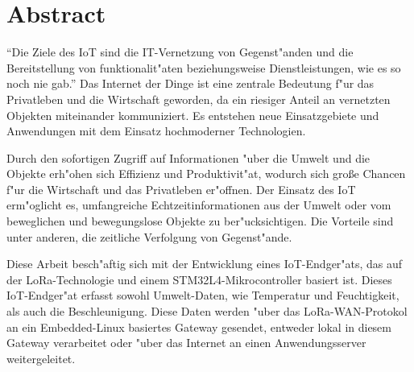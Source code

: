 
\chapter{ Abstract} \label{Abstract}	
\enquote{Die Ziele des IoT sind die IT-Vernetzung von Gegenst"anden und 
die Bereitstellung von funktionalit"aten beziehungsweise 
Dienstleistungen, wie es so noch nie gab.} Das Internet der Dinge ist 
eine zentrale Bedeutung f"ur das Privatleben und die Wirtschaft geworden, 
da ein riesiger Anteil an vernetzten Objekten miteinander kommuniziert. 
Es entstehen neue Einsatzgebiete und Anwendungen mit dem Einsatz 
hochmoderner Technologien. 

Durch den sofortigen Zugriff auf Informationen "uber die Umwelt und die 
Objekte erh"ohen sich Effizienz und Produktivit"at, wodurch sich gro\ss{}e 
Chancen f"ur die Wirtschaft und das Privatleben er"offnen. Der Einsatz des 
IoT erm"oglicht es, umfangreiche Echtzeitinformationen aus der Umwelt 
oder  vom beweglichen und bewegungslose Objekte zu ber"ucksichtigen. Die 
Vorteile sind unter anderen, die zeitliche Verfolgung von Gegenst"ande.

Diese Arbeit besch"aftig sich mit der Entwicklung eines IoT-Endger"ats, das 
auf der LoRa-Technologie und einem STM32L4-Mikrocontroller basiert ist. 
Dieses IoT-Endger"at erfasst sowohl Umwelt-Daten, wie
Temperatur 
und Feuchtigkeit, als auch die Beschleunigung. Diese Daten 
werden "uber das LoRa-WAN-Protokol an ein Embedded-Linux basiertes 
Gateway gesendet, entweder lokal in diesem Gateway verarbeitet oder 
"uber das Internet an einen Anwendungsserver weitergeleitet. 


\newpage




